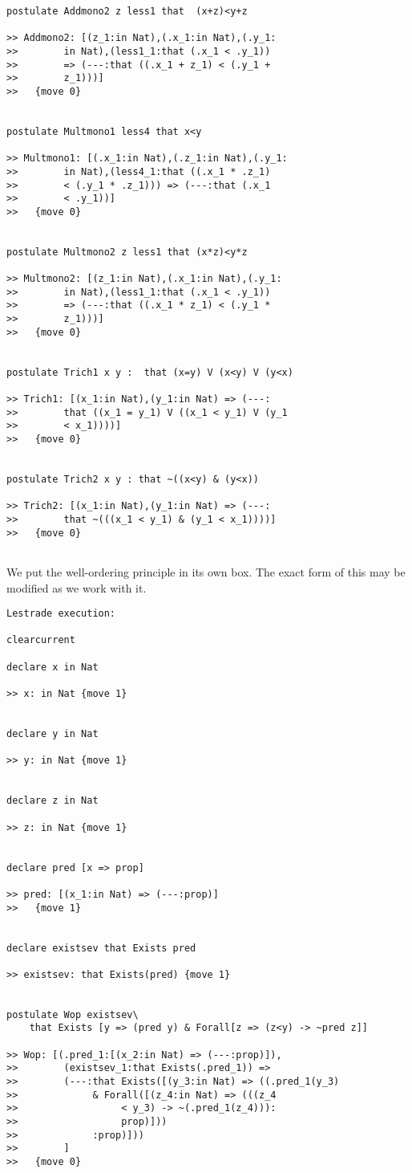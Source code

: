 \documentclass[12pt]{article}
\begin{document}
\begin{verbatim}
postulate Addmono2 z less1 that  (x+z)<y+z

>> Addmono2: [(z_1:in Nat),(.x_1:in Nat),(.y_1:
>>        in Nat),(less1_1:that (.x_1 < .y_1)) 
>>        => (---:that ((.x_1 + z_1) < (.y_1 + 
>>        z_1)))]
>>   {move 0}


postulate Multmono1 less4 that x<y

>> Multmono1: [(.x_1:in Nat),(.z_1:in Nat),(.y_1:
>>        in Nat),(less4_1:that ((.x_1 * .z_1) 
>>        < (.y_1 * .z_1))) => (---:that (.x_1 
>>        < .y_1))]
>>   {move 0}


postulate Multmono2 z less1 that (x*z)<y*z

>> Multmono2: [(z_1:in Nat),(.x_1:in Nat),(.y_1:
>>        in Nat),(less1_1:that (.x_1 < .y_1)) 
>>        => (---:that ((.x_1 * z_1) < (.y_1 * 
>>        z_1)))]
>>   {move 0}


postulate Trich1 x y :  that (x=y) V (x<y) V (y<x)

>> Trich1: [(x_1:in Nat),(y_1:in Nat) => (---:
>>        that ((x_1 = y_1) V ((x_1 < y_1) V (y_1 
>>        < x_1))))]
>>   {move 0}


postulate Trich2 x y : that ~((x<y) & (y<x))

>> Trich2: [(x_1:in Nat),(y_1:in Nat) => (---:
>>        that ~(((x_1 < y_1) & (y_1 < x_1))))]
>>   {move 0}


\end{verbatim}

We put the well-ordering principle in its own box.  The exact form of this may be modified as we work with it.

\begin{verbatim}Lestrade execution:

clearcurrent

declare x in Nat

>> x: in Nat {move 1}


declare y in Nat

>> y: in Nat {move 1}


declare z in Nat

>> z: in Nat {move 1}


declare pred [x => prop]

>> pred: [(x_1:in Nat) => (---:prop)]
>>   {move 1}


declare existsev that Exists pred

>> existsev: that Exists(pred) {move 1}


postulate Wop existsev\
    that Exists [y => (pred y) & Forall[z => (z<y) -> ~pred z]]

>> Wop: [(.pred_1:[(x_2:in Nat) => (---:prop)]),
>>        (existsev_1:that Exists(.pred_1)) => 
>>        (---:that Exists([(y_3:in Nat) => ((.pred_1(y_3) 
>>             & Forall([(z_4:in Nat) => (((z_4 
>>                  < y_3) -> ~(.pred_1(z_4))):
>>                  prop)]))
>>             :prop)]))
>>        ]
>>   {move 0}


\end{verbatim}
\end{document}
